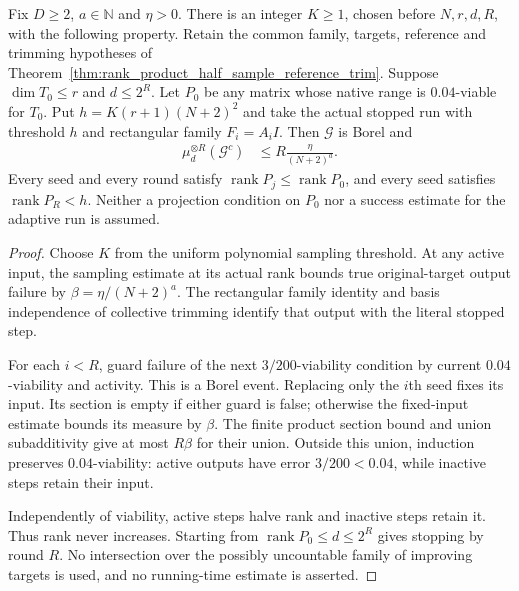 \begin{theorem}
    \label{thm:stopped_half_sampling_joint_probability}
    \leanok
    Fix $D\ge2$, $a\in\mathbb N$ and $\eta>0$. There is an integer
    $K\ge1$, chosen before $N,r,d,R$, with the following property.
    Retain the common family, targets, reference and trimming hypotheses
    of Theorem~\ref{thm:rank_product_half_sample_reference_trim}.
    Suppose $\dim T_0\le r$ and $d\le2^R$. Let $P_0$ be any matrix whose
    native range is $0.04$-viable for $T_0$. Put
    $h=K(r+1)(N+2)^2$ and take the actual stopped run with threshold $h$
    and rectangular family $F_i=A_iI$. Then $\mathcal G$ is Borel and
    \begin{align}
        \mu_d^{\otimes R}(\mathcal G^c)
         & \le R\frac{\eta}{(N+2)^a}.
    \end{align}
    Every seed and every round satisfy
    $\operatorname{rank}P_j\le\operatorname{rank}P_0$, and every seed
    satisfies $\operatorname{rank}P_R<h$. Neither a projection condition
    on $P_0$ nor a success estimate for the adaptive run is assumed.
\end{theorem}
\begin{proof}\leanok
    Choose $K$ from the uniform polynomial sampling threshold. At any
    active input, the sampling estimate at its actual rank bounds true
    original-target output failure by $\beta=\eta/(N+2)^a$.
    The rectangular family identity and basis independence of collective
    trimming identify that output with the literal stopped step.

    For each $i<R$, guard failure of the next $3/200$-viability condition
    by current $0.04$-viability and activity. This is a Borel event.
    Replacing only the $i$th seed fixes its input. Its section is empty
    if either guard is false; otherwise the fixed-input estimate bounds
    its measure by $\beta$. The finite product section bound and union
    subadditivity give at most $R\beta$ for their union. Outside this
    union, induction preserves $0.04$-viability: active outputs have
    error $3/200<0.04$, while inactive steps retain their input.

    Independently of viability, active steps halve rank and inactive
    steps retain it. Thus rank never increases. Starting from
    $\operatorname{rank}P_0\le d\le2^R$ gives stopping by round $R$.
    No intersection over the possibly uncountable family of improving
    targets is used, and no running-time estimate is asserted.
\end{proof}

